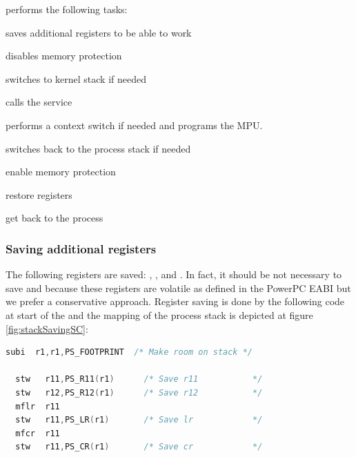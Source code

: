  performs the following tasks:
\begin{penum}
\item saves additional registers to be able to work
\item disables memory protection
\item switches to kernel stack if needed
\item calls the service
\item performs a context switch if needed and programs the MPU.
\item switches back to the process stack if needed
\item enable memory protection
\item restore registers
\item get back to the process
\end{penum}


\subsubsection{Saving additional registers}

The following registers are saved: , ,  and . In fact, it should be not necessary to save  and  because these registers are volatile as defined in the PowerPC EABI \cite{PPCeabi} but we prefer a conservative approach. Register saving is done by the following code at start of the  and the mapping of the process stack is depicted at figure \ref{fig:stackSavingSC}:

\begin{lstlisting}[language=C]
  subi  r1,r1,PS_FOOTPRINT  /* Make room on stack */

  stw   r11,PS_R11(r1)      /* Save r11           */
  stw   r12,PS_R12(r1)      /* Save r12           */
  mflr  r11
  stw   r11,PS_LR(r1)       /* Save lr            */
  mfcr  r11
  stw   r11,PS_CR(r1)       /* Save cr            */
\end{lstlisting}

